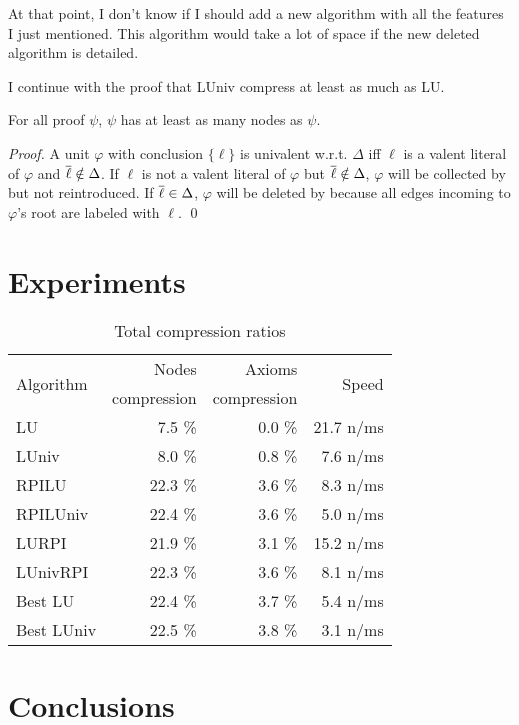 \documentclass{llncs}
\begin{document}
\begin{jb}
At that point, I don't know if I should add a new algorithm with all the features I just mentioned.
This algorithm would take a lot of space if the new deleted algorithm is detailed.

I continue with the proof that LUniv compress at least as much as LU.
\end{jb}

\begin{proposition}
For all proof $\psi$,
{\LowerUnits\FuncSty{(}$\psi$\FuncSty{)}}
has at least as many nodes as 
{\LowerUnivalents\FuncSty{(}$\psi$\FuncSty{)}}.
\end{proposition}

\begin{proof}
A unit $\varphi$ with conclusion $\{\ell\}$ is univalent w.r.t. $\Delta$ iff $\ell$ is a valent
literal of $\varphi$ and $\overline{\ell} \notin \Delta$.  If $\ell$ is not a valent literal of
$\varphi$ but $\overline{\ell} \notin \Delta$, $\varphi$ will be collected by {\LowerUnivalents} but not
reintroduced.  If $\overline{\ell} \in \Delta$, $\varphi$ will be deleted by {\LowerUnivalents} because
all edges incoming to $\varphi$'s root are labeled with $\ell$. \qed
\end{proof}


\section{Experiments}

\begin{table}[ht]
  \centering
  \begin{tabular}{lrrr}
    \toprule
    \multirow{2}{*}{Algorithm} & Nodes       & Axioms      & \multirow{2}{*}{Speed} \\
                               & compression & compression & \\
    \midrule
    LU         &  7.5 \% &  0.0 \% & 21.7 n/ms \\
    LUniv      &  8.0 \% &  0.8 \% &  7.6 n/ms \\
    RPILU      & 22.3 \% &  3.6 \% &  8.3 n/ms \\
    RPILUniv   & 22.4 \% &  3.6 \% &  5.0 n/ms \\
    LURPI      & 21.9 \% &  3.1 \% & 15.2 n/ms \\
    LUnivRPI   & 22.3 \% &  3.6 \% &  8.1 n/ms \\
    Best LU    & 22.4 \% &  3.7 \% &  5.4 n/ms \\
    Best LUniv & 22.5 \% &  3.8 \% &  3.1 n/ms \\
    \bottomrule
  \end{tabular}
  \caption{Total compression ratios}
\end{table}







\section{Conclusions}



\end{document}
